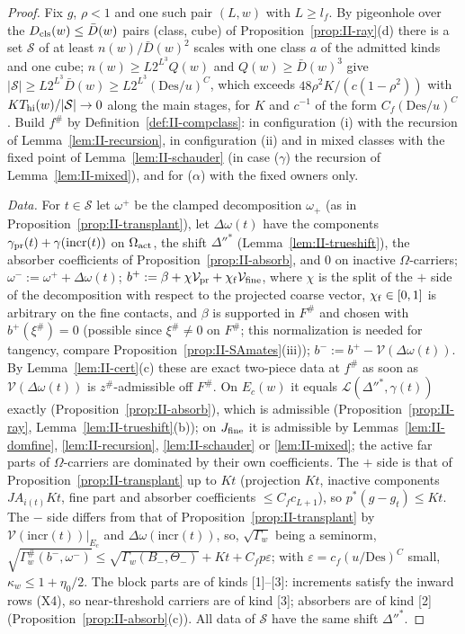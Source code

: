 \documentclass[10pt]{amsart}
\theoremstyle{definition}
\theoremstyle{remark}
\begin{document}
\begin{proof}
Fix $g$, $\rho<1$ and one such pair $(L,w)$ with $L\ge l_f$.  By pigeonhole over the
$D_{\rm cls}(w)\le\bar D(w)$ pairs (class, cube) of Proposition~\ref{prop:II-ray}(d)
there is a set $\mathcal S$ of at least $n(w)/\bar D(w)^2$ scales with one class
$a$ of the admitted kinds and one cube; $n(w)\ge L2^{L^3}Q(w)$ and $Q(w)\ge\bar D(w)^3$ give $|\mathcal S|\ge
L2^{L^3}\bar D(w)\ge L2^{L^3}(\mathrm{Des}/u)^C$, which exceeds $48\rho^2K/(c(1-\rho^2))$ with $K T_{\rm hi}(w)/|\mathcal S|
\to0$ along the main stages, for $K$ and $c^{-1}$ of the form $C_f(\mathrm{Des}/u)^C$.
Build $f^\#$ by Definition~\ref{def:II-compclass}: in configuration (i) with the
recursion of Lemma~\ref{lem:II-recursion}, in configuration (ii) and in mixed classes
with the fixed point of Lemma~\ref{lem:II-schauder} (in case ($\gamma$) the recursion of
Lemma~\ref{lem:II-mixed}), and for ($\alpha$) with the fixed owners only.

\emph{Data.}  For $t\in\mathcal S$ let $\omega^+$ be the clamped decomposition $\omega_+$ (as in
Proposition~\ref{prop:II-transplant}), let $\Delta\omega(t)$ have the components $\gamma_{\rm pr}(t)+
\gamma(\mathrm{incr}(t))$ on $\Omega_{\rm act}$, the shift $\Delta''^*$ (Lemma~\ref{lem:II-trueshift}), the
absorber coefficients of Proposition~\ref{prop:II-absorb}, and $0$ on inactive
$\Omega$-carriers; $\omega^-:=\omega^++\Delta\omega(t)$; $b^+:=\beta+\chi\mathcal V_{\rm pr}+\chi_{\rm f}\mathcal V_{\rm
fine}$, where $\chi$ is the split of the $+$ side of the decomposition with respect
to the projected coarse vector, $\chi_{\rm f}\in[0,1]$ is arbitrary on the fine contacts,
and $\beta$ is supported in $F^\#$ and chosen with $b^+(\xi^\#)=0$ (possible
since $\xi^\#\ne0$ on $F^\#$; this normalization is needed for tangency, compare
Proposition~\ref{prop:II-SAmates}(iii)); $b^-:=b^+-\mathcal V(\Delta\omega(t))$.  By
Lemma~\ref{lem:II-cert}(c) these are exact two-piece data at $f^\#$ as soon as
$\mathcal V(\Delta\omega(t))$ is $z^\#$-admissible off $F^\#$.  On $E_c(w)$ it equals $\mathcal L(\Delta''^*,
\gamma(t))$ exactly (Proposition~\ref{prop:II-absorb}), which is admissible
(Proposition~\ref{prop:II-ray}, Lemma~\ref{lem:II-trueshift}(b)); on $J_{\rm fine}$ it is
admissible by Lemmas~\ref{lem:II-domfine}, \ref{lem:II-recursion},
\ref{lem:II-schauder} or \ref{lem:II-mixed}; the active far parts of $\Omega$-carriers
are dominated by their own coefficients.  The $+$ side is that of
Proposition~\ref{prop:II-transplant} up to $Kt$ (projection $Kt$, inactive components
$JA_{i(t)}Kt$, fine part and absorber coefficients $\le C_fc_{L+1}$), so $p^*(g-g_t)\le
Kt$.  The $-$ side differs from that of Proposition~\ref{prop:II-transplant} by
$\mathcal V(\mathrm{incr}(t))|_{E_c}$ and $\Delta\omega(\mathrm{incr}(t))$, so, $\sqrt{\Gamma_w}$ being a seminorm,
$\sqrt{\Gamma^\#_w(b^-,\omega^-)}\le\sqrt{\Gamma_w(B_-,\Theta_-)}+Kt+C_fp\varepsilon$; with $\varepsilon=c_f
(u/\mathrm{Des})^C$ small, $\kappa_w\le1+\eta_0/2$.  The block parts are of kinds [1]--[3]:
increments satisfy the inward rows (X4), so near-threshold carriers are of kind
[3]; absorbers are of kind [2] (Proposition~\ref{prop:II-absorb}(c)).  All data of
$\mathcal S$ have the same shift $\Delta''^*$.


\end{proof}
\end{document}
